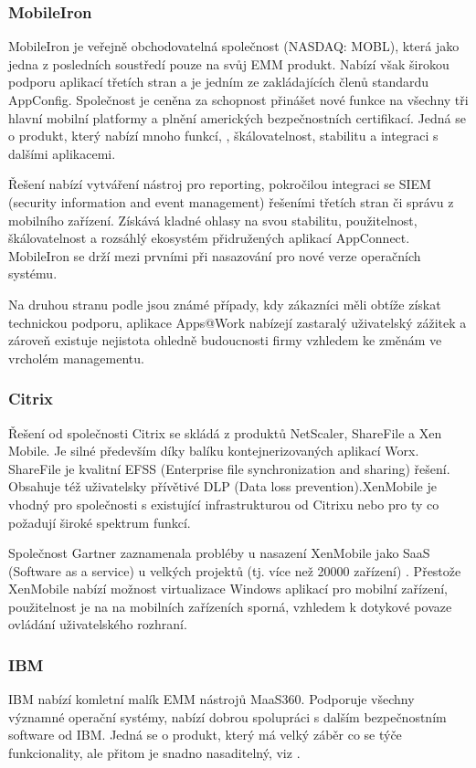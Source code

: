 \subsubsection{MobileIron}
MobileIron je veřejně obchodovatelná společnost (NASDAQ: MOBL), která jako jedna z posledních soustředí pouze na svůj EMM produkt. Nabízí však širokou podporu aplikací třetích stran a je jedním ze zakládajících členů standardu AppConfig. Společnost je ceněna za schopnost přinášet nové funkce na všechny tři hlavní mobilní platformy a plnění amerických bezpečnostních certifikací. Jedná se o produkt, který nabízí mnoho funkcí, , škálovatelnost, stabilitu a integraci s dalšími aplikacemi.

Řešení nabízí vytváření nástroj pro reporting, pokročilou integraci se SIEM (security information and event management) řešeními třetích stran či správu z mobilního zařízení. Získává kladné ohlasy na svou stabilitu, použitelnost, škálovatelnost a rozsáhlý ekosystém přidružených aplikací AppConnect. MobileIron se drží mezi prvními při nasazování pro nové verze operačních systému.

Na druhou stranu podle \cite{Gartner_EMM_2016} jsou známé případy, kdy zákazníci měli obtíže získat technickou podporu, aplikace Apps@Work nabízejí zastaralý uživatelský zážitek a zároveň existuje nejistota ohledně budoucnosti firmy vzhledem ke změnám ve vrcholém managementu.

\subsubsection{Citrix}
Řešení od společnosti Citrix se skládá z produktů NetScaler, ShareFile a Xen Mobile. Je silné především díky balíku kontejnerizovaných aplikací Worx. ShareFile je kvalitní EFSS (Enterprise file synchronization and sharing) řešení. Obsahuje též uživatelsky přívětivé DLP (Data loss prevention).XenMobile je vhodný pro společnosti s existující infrastrukturou od Citrixu nebo pro ty co požadují široké spektrum funkcí.

Společnost Gartner zaznamenala probléby u nasazení XenMobile jako SaaS (Software as a service) u velkých projektů (tj. více než 20000 zařízení) \cite{Gartner_EMM_2016}. Přestože XenMobile nabízí možnost virtualizace Windows aplikací pro mobilní zařízení, použitelnost je na na mobilních zařízeních sporná, vzhledem k dotykové povaze ovládání uživatelského rozhraní. 


\subsubsection{IBM}
IBM nabízí komletní malík EMM nástrojů MaaS360. Podporuje všechny významné operační systémy, nabízí dobrou spolupráci s dalším bezpečnostním software od IBM. Jedná se o produkt, který má velký záběr co se týče funkcionality, ale přitom je snadno nasaditelný, viz \cite{Gartner_EMM_2016}.



